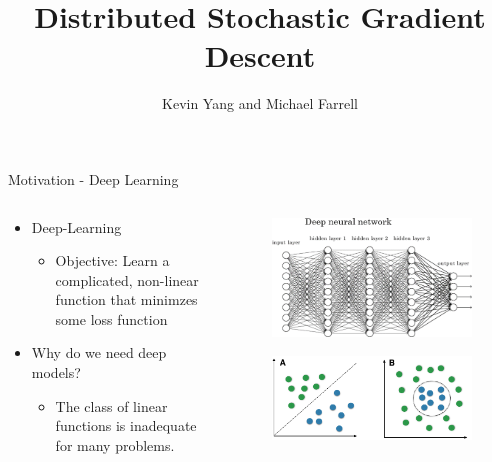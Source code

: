 \documentclass{beamer}
\title{ Distributed Stochastic Gradient Descent }
\author{Kevin Yang and Michael Farrell}
\begin{document}
\begin{frame}
  \titlepage
\end{frame}

\begin{frame}{Motivation - Deep Learning}

\begin{columns}[T] %
\begin{column}{.48\textwidth}
\begin{itemize}
\item Deep-Learning
\begin{itemize}
\item Objective: Learn a complicated, non-linear function that minimzes some loss function
\end{itemize}
\item Why do we need deep models?
\begin{itemize}
\item The class of linear functions is inadequate for many problems.
\end{itemize}
\end{itemize}
\end{column}%
\hfill%
\begin{column}{.48\textwidth}
\begin{figure}
    \includegraphics[scale = .35]{./img/deep_learning}
      \caption{}
\end{figure}
\begin{figure}
    \includegraphics[scale = .17]{./img/lin_v_nonlin}
      \caption{}
     

\end{figure}
\end{column}
\end{columns}
\end{frame}
\end{document}
